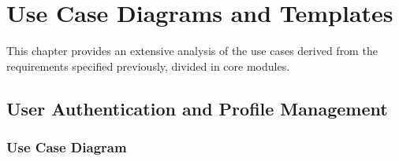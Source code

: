 \chapter{Use Case Diagrams and Templates}
This chapter provides an extensive analysis of the use cases derived from the requirements specified previously, divided in core modules.

\section{User Authentication and Profile Management}

\subsection{Use Case Diagram}

